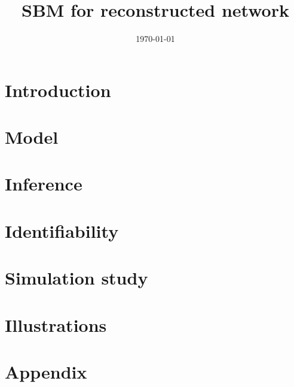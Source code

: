 \documentclass[a4paper]{article}
\begin{document}
\title{SBM for reconstructed network}

\author{} 

\date{\today}
\maketitle

\tableofcontents

\newpage \section{Introduction}

\newpage \section{Model}


\newpage \section{Inference}


\newpage \section{Identifiability}


\newpage \section{Simulation study}


\newpage \section{Illustrations}





\appendix

\newpage \section{Appendix}


\end{document}
